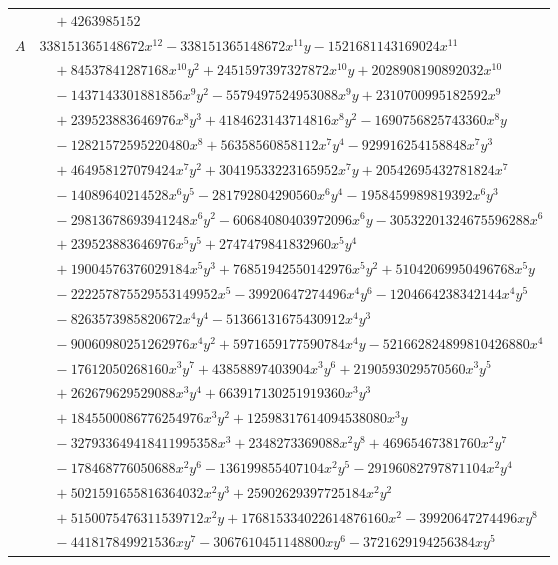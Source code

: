 \documentclass[11pt]{article}
\begin{document}
\begin{longtable}{@{}ll@{}}
 & $\quad +4263985152$\\
$A$ & $338151365148672x^{12}-338151365148672x^{11}y-1521681143169024x^{11}$\\
 & $\quad +84537841287168x^{10}y^{2}+2451597397327872x^{10}y+2028908190892032x^{10}$\\
 & $\quad -1437143301881856x^{9}y^{2}-5579497524953088x^{9}y+2310700995182592x^{9}$\\
 & $\quad +239523883646976x^{8}y^{3}+4184623143714816x^{8}y^{2}-1690756825743360x^{8}y$\\
 & $\quad -12821572595220480x^{8}+56358560858112x^{7}y^{4}-929916254158848x^{7}y^{3}$\\
 & $\quad +464958127079424x^{7}y^{2}+30419533223165952x^{7}y+20542695432781824x^{7}$\\
 & $\quad -14089640214528x^{6}y^{5}-281792804290560x^{6}y^{4}-1958459989819392x^{6}y^{3}$\\
 & $\quad -29813678693941248x^{6}y^{2}-60684080403972096x^{6}y-30532201324675596288x^{6}$\\
 & $\quad +239523883646976x^{5}y^{5}+2747479841832960x^{5}y^{4}$\\
 & $\quad +19004576376029184x^{5}y^{3}+76851942550142976x^{5}y^{2}+51042069950496768x^{5}y$\\
 & $\quad -222257875529553149952x^{5}-39920647274496x^{4}y^{6}-1204664238342144x^{4}y^{5}$\\
 & $\quad -8263573985820672x^{4}y^{4}-51366131675430912x^{4}y^{3}$\\
 & $\quad -90060980251262976x^{4}y^{2}+5971659177590784x^{4}y-521662824899810426880x^{4}$\\
 & $\quad -17612050268160x^{3}y^{7}+43858897403904x^{3}y^{6}+2190593029570560x^{3}y^{5}$\\
 & $\quad +262679629529088x^{3}y^{4}+663917130251919360x^{3}y^{3}$\\
 & $\quad +1845500086776254976x^{3}y^{2}+12598317614094538080x^{3}y$\\
 & $\quad -327933649418411995358x^{3}+2348273369088x^{2}y^{8}+46965467381760x^{2}y^{7}$\\
 & $\quad -178468776050688x^{2}y^{6}-136199855407104x^{2}y^{5}-29196082797871104x^{2}y^{4}$\\
 & $\quad +5021591655816364032x^{2}y^{3}+25902629397725184x^{2}y^{2}$\\
 & $\quad +5150075476311539712x^{2}y+176815334022614876160x^{2}-39920647274496xy^{8}$\\
 & $\quad -441817849921536xy^{7}-3067610451148800xy^{6}-3721629194256384xy^{5}$\\

\end{longtable}
\end{document}
